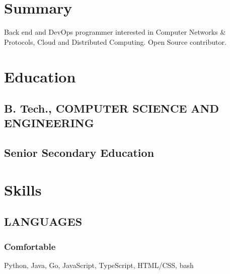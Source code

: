 \documentclass[letterpaper]{deedy-resume} %
\begin{document}
\begin{minipage}[t]{0.33\textwidth} %


\section{Summary}
Back end and DevOps programmer interested in Computer Networks \& Protocols, Cloud and Distributed Computing. Open Source contributor.
\sectionspace %



\section{Education} 


\subsection{B. Tech., COMPUTER SCIENCE AND ENGINEERING }

\sectionspace %

\subsection{Senior Secondary Education}
\sectionspace %


\section{Skills}
\subsection{LANGUAGES}
\subsubsection*{Comfortable}
\squeezeup
Python, Java, Go, JavaScript, TypeScript, HTML/CSS, bash
\subsectionspace %

\end{minipage}
\end{document}
